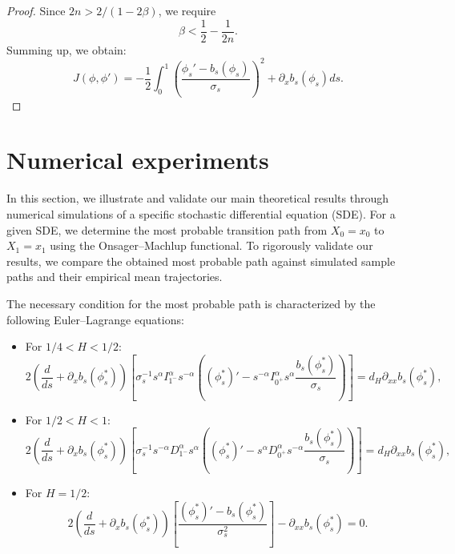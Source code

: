 \documentclass[preprint,12pt]{elsarticle}
\theoremstyle{definition}  %
\theoremstyle{plain}  %
\begin{document}
\begin{proof}
Since $2n > 2/(1-2\beta)$, we require
\[
   \beta < \frac{1}{2} - \frac{1}{2n}.
\]
 Summing up, we obtain:
 \begin{equation*}
	J(\phi,\phi')=-\frac{1}{2} \int_0^1 \left(\frac{\phi_s' - b_s\left(\phi_s\right)}{\sigma_s}\right)^2+ \partial_xb_s(\phi_s)ds.
	\end{equation*}


\end{proof}
\section{Numerical experiments}
\label{Numeriacal experiments}	

In this section, we illustrate and validate our main theoretical results through numerical simulations of a specific stochastic differential equation (SDE). For a given SDE, we determine the most probable transition path from $X_0 = x_0$ to $X_1 = x_1$ using the Onsager–Machlup functional. To rigorously validate our results, we compare the obtained most probable path against simulated sample paths and their empirical mean trajectories.

The necessary condition for the most probable path is characterized by the following Euler–Lagrange equations:

\begin{itemize}
    \item For $1/4 < H < 1/2$:
    \begin{equation*}
    2\left( \frac{d}{ds} + \partial_x b_s(\phi_s^*) \right) 
    \left[ 
    \sigma_s^{-1} s^\alpha I^{\alpha}_{1^-} s^{-\alpha} \left((\phi_s^*)' -  s^{-\alpha}I_{0^+}^\alpha s^\alpha \frac{ b_s(\phi_s^*)}{\sigma_s} \right)
    \right] 
    = d_H \partial_{xx} b_s(\phi_s^*) ,
    \end{equation*}

    \item For $1/2<H < 1$:
    \begin{equation*}
    2\left( \frac{d}{ds} + \partial_x b_s(\phi_s^*) \right) 
    \left[ 
    \sigma_s^{-1} s^{-\alpha} D^{\alpha}_{1^-} s^{\alpha} \left( 
   (\phi_s^*)'-s^\alpha D_{0^+}^\alpha s^{-\alpha} \frac{  b_s(\phi_s^*) }{\sigma_s} \right)
    \right] 
    = d_H \partial_{xx} b_s(\phi_s^*) ,
    \end{equation*}
    \item For $H = 1/2$:
    \begin{equation*}
    2\left( \frac{d}{ds} + \partial_x b_s(\phi_s^*) \right) 
    \left[ 
    \frac{ (\phi_s^*)' - b_s(\phi_s^*) }{\sigma_s^2} 
    \right] 
    - \partial_{xx} b_s(\phi_s^*) = 0.
    \end{equation*}
\end{itemize}
\end{document}
